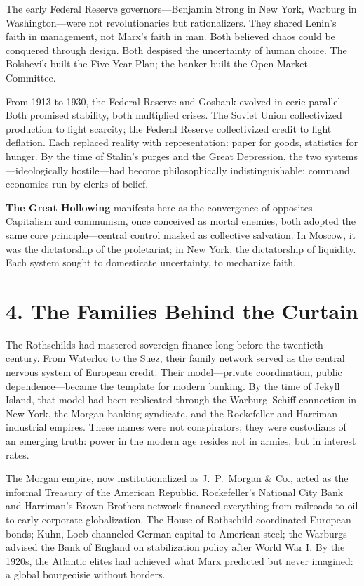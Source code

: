 \documentclass[11pt,twoside]{book}
\begin{document}
The early Federal Reserve governors—Benjamin Strong in New York, Warburg in Washington—were not revolutionaries but rationalizers.  
They shared Lenin’s faith in management, not Marx’s faith in man.  
Both believed chaos could be conquered through design.  
Both despised the uncertainty of human choice.  
The Bolshevik built the Five-Year Plan; the banker built the Open Market Committee.

From 1913 to 1930, the Federal Reserve and Gosbank evolved in eerie parallel.  
Both promised stability, both multiplied crises.  
The Soviet Union collectivized production to fight scarcity; the Federal Reserve collectivized credit to fight deflation.  
Each replaced reality with representation: paper for goods, statistics for hunger.  
By the time of Stalin’s purges and the Great Depression, the two systems—ideologically hostile—had become philosophically indistinguishable: command economies run by clerks of belief.

\textbf{The Great Hollowing} manifests here as the convergence of opposites.  
Capitalism and communism, once conceived as mortal enemies, both adopted the same core principle—central control masked as collective salvation.  
In Moscow, it was the dictatorship of the proletariat; in New York, the dictatorship of liquidity.  
Each system sought to domesticate uncertainty, to mechanize faith.

\section*{4. The Families Behind the Curtain}

The Rothschilds had mastered sovereign finance long before the twentieth century.  
From Waterloo to the Suez, their family network served as the central nervous system of European credit.  
Their model—private coordination, public dependence—became the template for modern banking.  
By the time of Jekyll Island, that model had been replicated through the Warburg–Schiff connection in New York, the Morgan banking syndicate, and the Rockefeller and Harriman industrial empires.  
These names were not conspirators; they were custodians of an emerging truth: power in the modern age resides not in armies, but in interest rates.

The Morgan empire, now institutionalized as J.~P.~Morgan \& Co., acted as the informal Treasury of the American Republic.  
Rockefeller’s National City Bank and Harriman’s Brown Brothers network financed everything from railroads to oil to early corporate globalization.  
The House of Rothschild coordinated European bonds; Kuhn, Loeb channeled German capital to American steel; the Warburgs advised the Bank of England on stabilization policy after World War I.  
By the 1920s, the Atlantic elites had achieved what Marx predicted but never imagined: a global bourgeoisie without borders.
\end{document}
